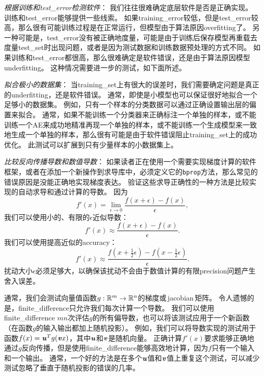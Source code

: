 \emph{根据训练和\gls{test_error}检测软件}：
我们往往很难确定底层软件是否是正确实现。
训练和\gls{test_error}能够提供一些线索。
如果\gls{training_error}较低，但是\gls{test_error}较高，那么很有可能训练过程是在正常运行，但模型由于算法原因\gls{overfitting}了。
另一种可能是，\gls{test_error}没有被正确地度量，可能是由于训练后保存模型再重载去度量\gls{test_set}时出现问题，或者是因为测试数据和训练数据预处理的方式不同。
如果训练和\gls{test_error}都很高，那么很难确定是软件错误，还是由于算法原因模型\gls{underfitting}。
这种情况需要进一步的测试，如下面所述。


\emph{拟合极小的数据集}：
当\gls{training_set}上有很大的误差时，我们需要确定问题是真正的\gls{underfitting}，还是软件错误。
通常，即使是小模型也可以保证很好地拟合一个足够小的数据集。
例如，只有一个样本的分类数据可以通过正确设置输出层的偏置来拟合。
通常，如果不能训练一个分类器来正确标注一个单独的样本，或不能训练一个\gls{AE}来成功地精准再现一个单独的样本，或不能训练一个生成模型来一致地生成一个单独的样本，那么很有可能是由于软件错误阻止\gls{training_set}上的成功优化。
此测试可以扩展到只有少量样本的小数据集上。


\emph{比较反向传播导数和数值导数}：
如果读者正在使用一个需要实现梯度计算的软件框架，或者在添加一个新操作到求导库中，必须定义它的\texttt{bprop}方法，那么常见的错误原因是没能正确地实现梯度表达。
验证这些求导正确性的一种方法是比较实现的自动求导和通过计算的导数。
因为
\begin{equation}
	f'(x) = \lim_{\epsilon \to 0} \frac{f(x+\epsilon) - f(x)}{\epsilon},
\end{equation}
我们可以使用小的、有限的$\epsilon$近似导数：
\begin{equation}
	f'(x) \approx \frac{f(x+\epsilon) - f(x)}{\epsilon}.
\end{equation}
我们可以使用提高近似的\gls{accuracy}：
\begin{equation}
	f'(x) \approx \frac{ f(x+\frac{1}{2}\epsilon) - f(x-\frac{1}{2}\epsilon) }{\epsilon}.
\end{equation}
扰动大小$\epsilon$必须足够大，以确保该扰动不会由于数值计算的有限\gls{precision}问题产生舍入误差。


通常，我们会测试向量值函数$g:\mathbb{R}^m \to \mathbb{R}^n$的梯度或\,\gls{jacobian}\,矩阵。
令人遗憾的是，\gls{finite_difference}只允许我们每次计算一个导数。
我们可以使用\gls{finite_difference} $mn$次评估$g$的所有偏导数，也可以将该测试应用于一个新函数（在函数$g$的输入输出都加上随机投影）。%
例如，我们可以将导数实现的测试用于函数$f(x) = \boldsymbol{\mathit{u}}^T g(\boldsymbol{\mathit{v}} x)$，其中$\boldsymbol{\mathit{u}}$和$\boldsymbol{\mathit{v}}$是随机向量。%
正确计算$f'(x)$要求能够正确地通过$g$反向传播，但是使用\gls{finite_difference}能够高效地计算，因为$f$只有一个输入和一个输出。
通常，一个好的方法是在多个$\boldsymbol{\mathit{u}}$值和$\boldsymbol{\mathit{v}}$值上重复这个测试，可以减少测试忽略了垂直于随机投影的错误的几率。%

